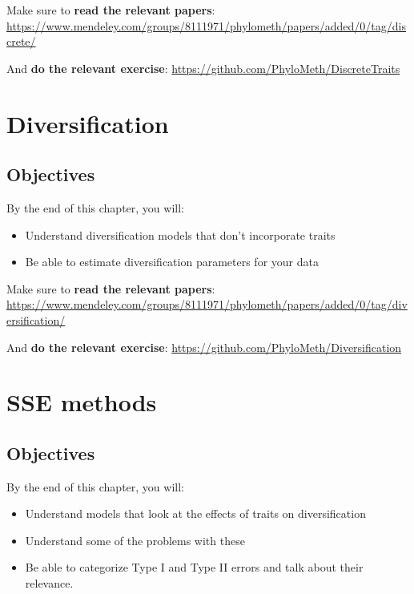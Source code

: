 \documentclass[]{book}
\providecommand{\tightlist}{%
  \setlength{\itemsep}{0pt}\setlength{\parskip}{0pt}}
\theoremstyle{definition}
\theoremstyle{definition}
\theoremstyle{remark}
\begin{document}
Make sure to \textbf{read the relevant papers}:
\url{https://www.mendeley.com/groups/8111971/phylometh/papers/added/0/tag/discrete/}

And \textbf{do the relevant exercise}:
\url{https://github.com/PhyloMeth/DiscreteTraits}

\chapter{Diversification}\label{diversification}

\section{Objectives}\label{objectives-3}

By the end of this chapter, you will:

\begin{itemize}
\tightlist
\item
  Understand diversification models that don't incorporate traits
\item
  Be able to estimate diversification parameters for your data
\end{itemize}

Make sure to \textbf{read the relevant papers}:
\url{https://www.mendeley.com/groups/8111971/phylometh/papers/added/0/tag/diversification/}

And \textbf{do the relevant exercise}:
\url{https://github.com/PhyloMeth/Diversification}

\chapter{SSE methods}\label{sse-methods}

\section{Objectives}\label{objectives-4}

By the end of this chapter, you will:

\begin{itemize}
\tightlist
\item
  Understand models that look at the effects of traits on
  diversification
\item
  Understand some of the problems with these
\item
  Be able to categorize Type I and Type II errors and talk about their
  relevance.
\end{itemize}
\end{document}
